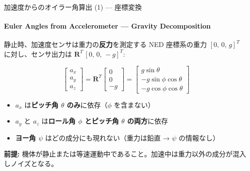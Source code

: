 \begin{frame}{加速度からのオイラー角算出 (1) --- 座標変換}
  \framesubtitle{Euler Angles from Accelerometer --- Gravity Decomposition}

  \begin{block}{静止時、加速度センサは重力の\textbf{反力}を測定する}
    {\small
    NED 座標系の重力 $[0,\,0,\,g]^T$ に対し、センサ出力は $\mathbf{R}^T\,[0,\,0,\,-g]^T$:
    }
  \end{block}

  {\small
  \[
  \begin{bmatrix} a_x \\ a_y \\ a_z \end{bmatrix}
  = \mathbf{R}^T
  \begin{bmatrix} 0 \\ 0 \\ -g \end{bmatrix}
  = \begin{bmatrix}
    g\sin\theta \\
    -g\sin\phi\cos\theta \\
    -g\cos\phi\cos\theta
  \end{bmatrix}
  \]
  }

  \vspace{-0.3em}

  {\small
  \begin{itemize}
    \item $a_x$ は\textbf{ピッチ角 $\theta$ のみ}に依存（$\phi$ を含まない）
    \item $a_y$ と $a_z$ は\textbf{ロール角 $\phi$ とピッチ角 $\theta$ の両方}に依存
    \item \textbf{ヨー角 $\psi$} はどの成分にも現れない（重力は鉛直 → $\psi$ の情報なし）
  \end{itemize}
  }

  \vspace{0.3em}

  {\footnotesize
  \textbf{前提:} 機体が静止または等速運動中であること。加速中は重力以外の成分が混入しノイズとなる。
  }
\end{frame}

